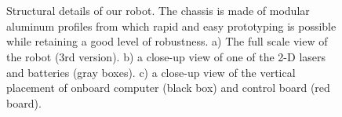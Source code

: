 \begin{figure}[ht]
    \centering
    \begin{subfigure}[b]{0.22\textwidth}
      	\centering
        \caption{}
        \label{fig:aluminum_structure}
    \end{subfigure}
    ~
    \begin{subfigure}[b]{0.22\textwidth}
      	\centering
        \caption{}
        \label{fig:batteries}
    \end{subfigure}
    ~
    \begin{subfigure}[b]{0.22\textwidth}
      	\centering
        \caption{}
        \label{fig:computer}
    \end{subfigure}
    \caption{Structural details of our robot. The chassis is made of modular aluminum profiles from which rapid and easy prototyping is possible while retaining a good level of robustness. a) The full scale view of the robot (3rd version). b) a close-up view of one of the 2-D lasers and batteries (gray boxes). c) a close-up view of the vertical placement of onboard computer (black box) and control board (red board).}
    \label{fig:structure_details}
\end{figure}

